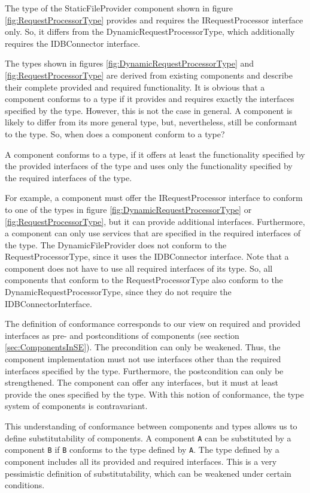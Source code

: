 The type of the StaticFileProvider component shown in figure \ref{fig:RequestProcessorType} provides and requires the IRequestProcessor interface only. So, it differs from the DynamicRequestProcessorType, which additionally requires the IDBConnector interface. 

The types shown in figures \ref{fig:DynamicRequestProcessorType} and \ref{fig:RequestProcessorType} are derived from existing components and describe their complete provided and required functionality.
It is obvious that a component conforms to a type if it provides and requires exactly the interfaces specified by the type. However, this is not the case in general. A component is likely to differ from its more general type, but, nevertheless, still be conformant to the type. So, when does a component conform to a type?

A component conforms to a type, if it offers at least the functionality specified by the provided interfaces of the type and uses only the functionality specified by the required interfaces of the type.

For example, a component must offer the IRequestProcessor interface to conform to one of the types in figure \ref{fig:DynamicRequestProcessorType} or \ref{fig:RequestProcessorType}, but it can provide additional interfaces.
Furthermore, a component can only use services that are specified in the required interfaces of the type. The DynamicFileProvider does not conform to the RequestProcessorType, since it uses the IDBConnector interface. Note that a component does not have to use all required interfaces of its type. So, all components that conform to the RequestProcessorType also conform to the DynamicRequestProcessorType, since they do not require the IDBConnectorInterface. 

The definition of conformance corresponds to our view on required and provided interfaces as pre- and postconditions of components (see section \ref{sec:ComponentsInSE}). The precondition can only be weakened. Thus, the component implementation must not use interfaces other than the required interfaces specified by the type. Furthermore, the postcondition can only be strengthened. The component can offer any interfaces, but it must at least provide the ones specified by the type. With this notion of conformance, the type system of components is contravariant.

This understanding of conformance between components and types allows us to define substitutability of components. A component \texttt{A} can be substituted by a component \texttt{B} if \texttt{B} conforms to the type defined by \texttt{A}. The type defined by a component includes all its provided and required interfaces. This is a very pessimistic definition of substitutability, which can be weakened under certain conditions. 

